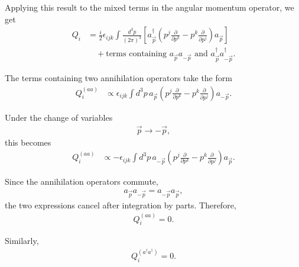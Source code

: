 \documentclass{article}
\begin{document}
Applying this result to the mixed terms in the angular momentum operator, we get
\begin{equation}
\begin{split}
Q_i
&=
\frac{i}{2}
\epsilon_{ijk}
\int \frac{d^3p}{(2\pi)^3}
\left[
a_{\vec p}^{\dagger}
\left(
p^j\frac{\partial}{\partial p^k}
-
p^k\frac{\partial}{\partial p^j}
\right)
a_{\vec p}
\right]
\\
&\quad
+
\text{terms containing }
a_{\vec p}a_{-\vec p}
\text{ and }
a_{\vec p}^{\dagger}a_{-\vec p}^{\dagger}.
\end{split}
\end{equation}

The terms containing two annihilation operators take the form
\begin{equation}
\begin{split}
Q_i^{(aa)}
&\propto
\epsilon_{ijk}
\int d^3p\,
a_{\vec p}
\left(
p^j\frac{\partial}{\partial p^k}
-
p^k\frac{\partial}{\partial p^j}
\right)
a_{-\vec p}.
\end{split}
\end{equation}

Under the change of variables
\begin{equation}
\begin{split}
\vec p\longrightarrow -\vec p,
\end{split}
\end{equation}
this becomes
\begin{equation}
\begin{split}
Q_i^{(aa)}
&\propto
-
\epsilon_{ijk}
\int d^3p\,
a_{-\vec p}
\left(
p^j\frac{\partial}{\partial p^k}
-
p^k\frac{\partial}{\partial p^j}
\right)
a_{\vec p}.
\end{split}
\end{equation}

Since the annihilation operators commute,
\begin{equation}
\begin{split}
a_{\vec p}a_{-\vec p}
=
a_{-\vec p}a_{\vec p},
\end{split}
\end{equation}
the two expressions cancel after integration by parts. Therefore,
\begin{equation}
\begin{split}
Q_i^{(aa)}=0.
\end{split}
\end{equation}

Similarly,
\begin{equation}
\begin{split}
Q_i^{(a^\dagger a^\dagger)}=0.
\end{split}
\end{equation}
\end{document}
